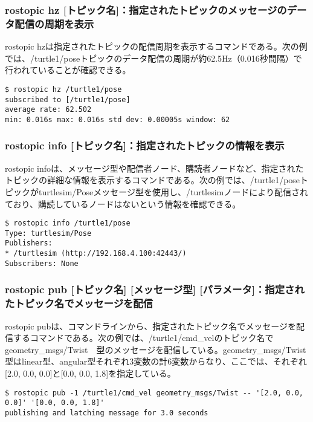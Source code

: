 \subsubsection{rostopic hz [トピック名]：指定されたトピックのメッセージのデータ配信の周期を表示}

rostopic hzは指定されたトピックの配信周期を表示するコマンドである。次の例では、/turtle1/poseトピックのデータ配信の周期が約62.5Hz（0.016秒間隔）で行われていることが確認できる。

\begin{lstlisting}[language=ROS]
$ rostopic hz /turtle1/pose
subscribed to [/turtle1/pose]
average rate: 62.502
min: 0.016s max: 0.016s std dev: 0.00005s window: 62
\end{lstlisting}

\subsubsection{rostopic info [トピック名]：指定されたトピックの情報を表示}

rostopic infoは、メッセージ型や配信者ノード、購読者ノードなど、指定されたトピックの詳細な情報を表示するコマンドである。次の例では、/turtle1/poseトピックがturtlesim/Poseメッセージ型を使用し、/turtlesimノードにより配信されており、購読しているノードはないという情報を確認できる。

\begin{lstlisting}[language=ROS]
$ rostopic info /turtle1/pose
Type: turtlesim/Pose
Publishers:
* /turtlesim (http://192.168.4.100:42443/)
Subscribers: None
\end{lstlisting}

\subsubsection{rostopic pub [トピック名] [メッセージ型] [パラメータ]：指定されたトピック名でメッセージを配信}

rostopic pubは、コマンドラインから、指定されたトピック名でメッセージを配信するコマンドである。次の例では、/turtle1/cmd\_velのトピック名でgeometry\_msgs/Twist　型のメッセージを配信している。geometry\_msgs/Twist 型はlinear型、angular型それぞれ3変数の計6変数からなり、ここでは、それぞれ[2.0, 0.0, 0.0]と[0.0, 0.0, 1.8]を指定している。

\begin{lstlisting}[language=ROS]
$ rostopic pub -1 /turtle1/cmd_vel geometry_msgs/Twist -- '[2.0, 0.0, 0.0]' '[0.0, 0.0, 1.8]'
publishing and latching message for 3.0 seconds
\end{lstlisting}

